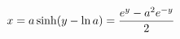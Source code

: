 \documentclass[preview]{standalone}
\begin{document}
\begin{align*}
\special{dvisvgm:raw <g id='unique000'>}x=a\sinh(y-\ln a)=\dfrac{e^y-a^2e^{-y}}{2}\special{dvisvgm:raw </g>}
\end{align*}
\end{document}
